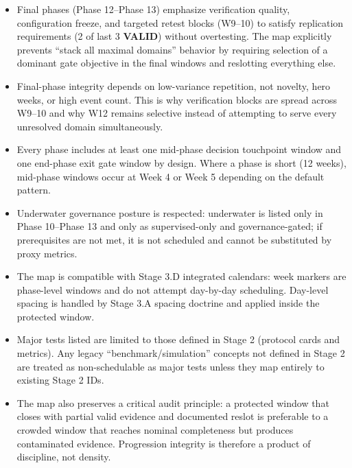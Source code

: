 \documentclass[10pt]{article}
\begin{document}
\begin{itemize}
\item Final phases (Phase 12–Phase 13) emphasize verification quality, configuration freeze, and targeted retest blocks (W9–10) to satisfy replication requirements (2 of last 3 \textbf{VALID}) without overtesting. The map explicitly prevents “stack all maximal domains” behavior by requiring selection of a dominant gate objective in the final windows and reslotting everything else.

\item Final-phase integrity depends on low-variance repetition, not novelty, hero weeks, or high event count. This is why verification blocks are spread across W9–10 and why W12 remains selective instead of attempting to serve every unresolved domain simultaneously.

\item Every phase includes at least one mid-phase decision touchpoint window and one end-phase exit gate window by design. Where a phase is short (12 weeks), mid-phase windows occur at Week 4 or Week 5 depending on the default pattern.

\item Underwater governance posture is respected: underwater is listed only in Phase 10–Phase 13 and only as supervised-only and governance-gated; if prerequisites are not met, it is not scheduled and cannot be substituted by proxy metrics.

\item The map is compatible with Stage 3.D integrated calendars: week markers are phase-level windows and do not attempt day-by-day scheduling. Day-level spacing is handled by Stage 3.A spacing doctrine and applied inside the protected window.

\item Major tests listed are limited to those defined in Stage 2 (protocol cards and metrics). Any legacy “benchmark/simulation” concepts not defined in Stage 2 are treated as non-schedulable as major tests unless they map entirely to existing Stage 2 IDs.

\item The map also preserves a critical audit principle: a protected window that closes with partial valid evidence and documented reslot is preferable to a crowded window that reaches nominal completeness but produces contaminated evidence. Progression integrity is therefore a product of discipline, not density.
\end{itemize}

\newpage
\end{document}
